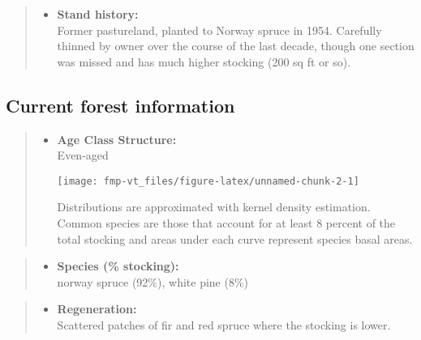 \documentclass[]{tufte-handout}
\providecommand{\tightlist}{%
  \setlength{\itemsep}{0pt}\setlength{\parskip}{0pt}}
\begin{document}
\begin{quote}
\begin{itemize}
\tightlist
\item
  \textbf{Stand history:}\\
  \vspace{2pt} Former pastureland, planted to Norway spruce in 1954.
  Carefully thinned by owner over the course of the last decade, though
  one section was missed and has much higher stocking (200 sq ft or so).
\end{itemize}
\end{quote}

\subsection{Current forest
information}\label{current-forest-information}

\begin{quote}
\begin{itemize}
\tightlist
\item
  \textbf{Age Class Structure:}\\
  \vspace{2pt} Even-aged\\

  \begin{marginfigure}
  \texttt{[image: fmp-vt\_files/figure-latex/unnamed-chunk-2-1]} \caption[Distributions are approximated with kernel density estimation]{Distributions are approximated with kernel density estimation. Common species are those that account for at least 8 percent of the total stocking and areas under each curve represent species basal areas.}\label{fig:unnamed-chunk-2}
  \end{marginfigure}
\end{itemize}
\end{quote}

\begin{quote}
\begin{itemize}
\tightlist
\item
  \textbf{Species (\% stocking):}\\
  \vspace{2pt} norway spruce (92\%), white pine (8\%)
\end{itemize}
\end{quote}

\begin{quote}
\begin{itemize}
\tightlist
\item
  \textbf{Regeneration:}\\
  \vspace{2pt} Scattered patches of fir and red spruce where the
  stocking is lower.
\end{itemize}
\end{quote}
\end{document}
